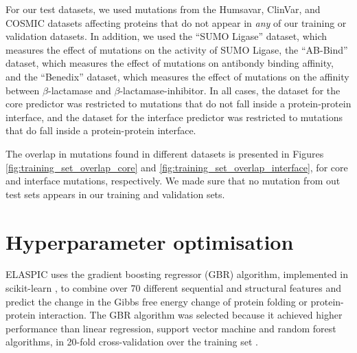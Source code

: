 For our test datasets, we used mutations from the Humsavar, ClinVar, and COSMIC datasets affecting proteins that do not appear in \textit{any} of our training or validation datasets. In addition, we used the ``SUMO Ligase'' dataset, which measures the effect of mutations on the activity of SUMO Ligase, the ``AB-Bind'' dataset, which measures the effect of mutations on antibondy binding affinity, and the ``Benedix'' dataset, which measures the effect of mutations on the affinity between $\beta$-lactamase and $\beta$-lactamase-inhibitor. In all cases, the dataset for the core predictor was restricted to mutations that do not fall inside a protein-protein interface, and the dataset for the interface predictor was restricted to mutations that do fall inside a protein-protein interface.

The overlap in mutations found in different datasets is presented in Figures \ref{fig:training_set_overlap_core} and \ref{fig:training_set_overlap_interface}, for core and interface mutations, respectively. We made sure that no mutation from out test sets appears in our training and validation sets.




\clearpage
\section{Hyperparameter optimisation} \label{sec:gridsearch}

ELASPIC uses the gradient boosting regressor (GBR) algorithm, implemented in scikit-learn \cite{scikit-learn}, to  combine over 70 different sequential and structural features and predict the change in the Gibbs free energy change of protein folding or protein-protein interaction. The GBR algorithm was selected because it achieved higher performance than linear regression, support vector machine and random forest algorithms, in 20-fold cross-validation over the training set \cite{berliner_combining_2014}.

